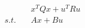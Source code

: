 \documentclass[preview]{standalone}
\begin{document}
\begin{align*}
\quad &x^TQx + u^T R u \\ s.t. \quad &Ax + Bu
\end{align*}
\end{document}
